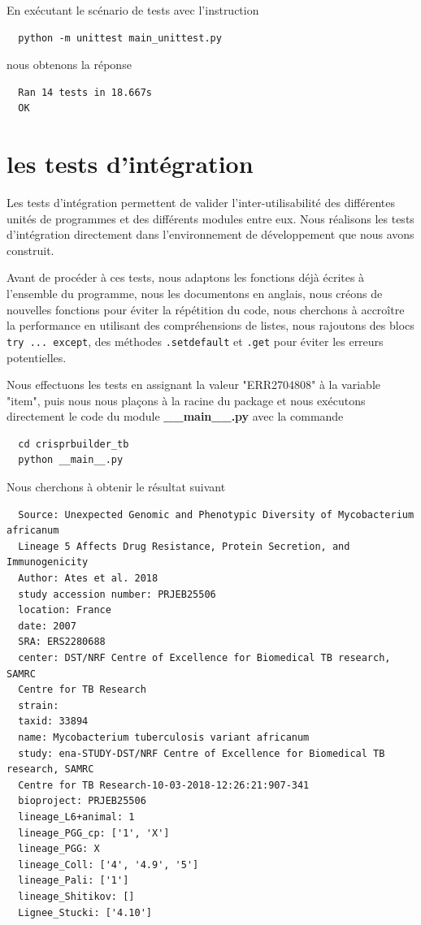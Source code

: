\documentclass[twoside,a4paper,11pt,frenchb,openany]{report}
\begin{document}
En exécutant le scénario de tests avec l'instruction

\begin{verbatim}
  python -m unittest main_unittest.py
\end{verbatim}

nous obtenons la réponse

\begin{verbatim}
  Ran 14 tests in 18.667s
  OK
\end{verbatim}




\section{les tests d'intégration}

Les tests d'intégration permettent de valider l'inter-utilisabilité des différentes unités de programmes  et des différents modules entre eux. Nous réalisons les tests d'intégration directement dans l'environnement de développement que nous avons construit.

Avant de procéder à ces tests, nous adaptons les fonctions déjà écrites à l'ensemble du programme, nous les documentons en anglais, nous créons de nouvelles fonctions pour éviter la répétition du code, nous cherchons à accroître la performance en utilisant des compréhensions de listes, nous rajoutons des blocs \texttt{try ... except}, des méthodes \texttt{.setdefault} et \texttt{.get} pour éviter les erreurs potentielles.

Nous effectuons les tests en assignant la valeur "ERR2704808" à la variable "item", puis nous nous plaçons à la racine du package et nous exécutons directement le code du module \textbf{\_\_main\_\_.py} avec la commande 

\begin{verbatim}
  cd crisprbuilder_tb
  python __main__.py
\end{verbatim}

Nous cherchons à obtenir le résultat suivant 

 \begin{verbatim}
  Source: Unexpected Genomic and Phenotypic Diversity of Mycobacterium africanum   
  Lineage 5 Affects Drug Resistance, Protein Secretion, and Immunogenicity
  Author: Ates et al. 2018
  study accession number: PRJEB25506
  location: France
  date: 2007
  SRA: ERS2280688
  center: DST/NRF Centre of Excellence for Biomedical TB research, SAMRC 
  Centre for TB Research
  strain: 
  taxid: 33894
  name: Mycobacterium tuberculosis variant africanum
  study: ena-STUDY-DST/NRF Centre of Excellence for Biomedical TB research, SAMRC 
  Centre for TB Research-10-03-2018-12:26:21:907-341
  bioproject: PRJEB25506
  lineage_L6+animal: 1
  lineage_PGG_cp: ['1', 'X']
  lineage_PGG: X
  lineage_Coll: ['4', '4.9', '5']
  lineage_Pali: ['1']
  lineage_Shitikov: []
  Lignee_Stucki: ['4.10']
\end{verbatim}
\end{document}

